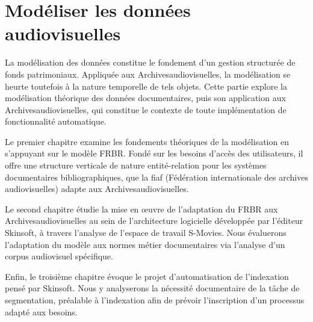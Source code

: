 \documentclass[12pt,twoside]{book}
\begin{document}
	\newpage{\pagestyle{empty}\cleardoublepage}



\printbibliography


	



\newpage{\pagestyle{empty}\cleardoublepage}


	\mainmatter

	
\part{Modéliser les données audiovisuelles}

La modélisation des données constitue le fondement d'un gestion structurée de fonds patrimoniaux. Appliquée aux \gls{Archivesaudiovisuelles}, la modélisation se heurte toutefois à la nature temporelle de tels objets. Cette partie explore la modélisation théorique des données documentaires, puis son application aux \gls{Archivesaudiovisuelles}, qui constitue le contexte de toute implémentation de fonctionnalité automatique.

Le premier chapitre examine les fondements théoriques de la modélisation en s'appuyant sur le modèle \gls{FRBR}. Fondé sur les besoins d'accès des utilisateurs, il offre une structure verticale de nature entité-relation pour les systèmes documentaires bibliographiques, que la \gls{fiaf} (Fédération internationale des archives audiovisuelles) adapte aux \gls{Archivesaudiovisuelles}.

Le second chapitre étudie la mise en œuvre de l'adaptation du \gls{FRBR} aux \gls{Archivesaudiovisuelles} au sein de l'architecture logicielle développée par l'éditeur Skinsoft, à travers l'analyse de l'espace de travail S-Movies. Nous évaluerons l'adaptation du modèle aux normes métier documentaires via l'analyse d'un corpus audiovisuel spécifique.

Enfin, le troisième chapitre évoque le projet d'automatisation de l'indexation pensé par Skinsoft. Nous y analyserons la nécessité documentaire de la tâche de segmentation, préalable à l'indexation afin de prévoir l'inscription d'un processus adapté aux besoins.






\end{document}
